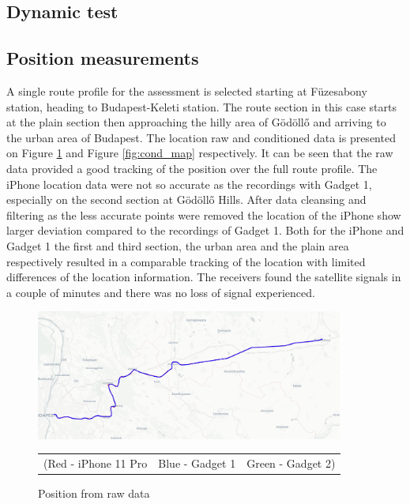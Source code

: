 \documentclass{article}
\begin{document}
		\subsection{Dynamic test}
		\subsection{Position measurements}
			A single route profile for the assessment is selected starting at Füzesabony station, heading to Budapest-Keleti station. The route section in this case starts at the plain section then approaching the hilly area of Gödöllő and arriving to the urban area of Budapest. The location raw and conditioned data is presented on Figure \ref{fig:raw_map} and Figure \ref{fig:cond_map} respectively. It can be seen that the raw data provided a good tracking of the position over the full route profile. The iPhone location data were not so accurate as the recordings with Gadget 1, especially on the second section at Gödöllő Hills. After data cleansing and filtering as the less accurate points were removed the location of the iPhone show larger deviation compared to the recordings of Gadget 1. Both for the iPhone and Gadget 1 the first and third section, the urban area and the plain area respectively resulted in a comparable tracking of the location with limited differences of the location information. The receivers found the satellite signals in a couple of minutes and there was no loss of signal experienced.
			\begin{figure}[h]
				\centering
		      \includegraphics[width=0.9\textwidth]{raw_map.png}
		      \caption{Position from raw data}
		      \begin{tabular}{c c c}
			   		\footnotesize (Red - iPhone 11 Pro & \footnotesize Blue - Gadget 1 & \footnotesize Green - Gadget 2)
		      \end{tabular} 
		      \label{fig:raw_map}
			\end{figure}
\end{document}
